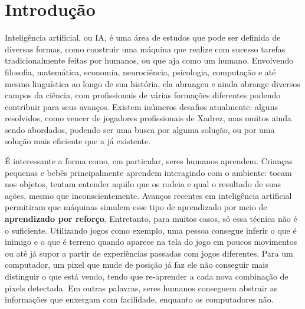 
\chapter{Introdução}
\label{cap:introducao}

Inteligência artificial, ou IA, é uma área de estudos que pode ser definida de diversas formas, como construir uma máquina que realize com sucesso tarefas tradicionalmente feitas por humanos, ou que aja como um humano.
Envolvendo filosofia, matemática, economia, neurociência, psicologia, computação e até mesmo linguística ao longo de sua história, ela abrangeu e ainda abrange diversos campos da ciência, com profissionais de várias formações diferentes podendo contribuir para seus avanços.
Existem inúmeros desafios atualmente: alguns resolvidos, como vencer de jogadores profissionais de Xadrez, mas muitos ainda sendo abordados, podendo ser uma busca por alguma solução, ou por uma solução mais eficiente que a já existente.

É interessante a forma como, em particular, seres humanos aprendem.
Crianças pequenas e bebês principalmente aprendem interagindo com o ambiente: tocam nos objetos, tentam entender aquilo que os rodeia e qual o resultado de suas ações, mesmo que inconscientemente.
Avanços recentes em inteligência artificial permitiram que máquinas simulem esse tipo de aprendizado por meio de \textbf{aprendizado por reforço}.
Entretanto, para muitos casos, só essa técnica não é o suficiente.
Utilizando jogos como exemplo, uma pessoa consegue inferir o que é inimigo e o que é terreno quando aparece na tela do jogo em poucos movimentos ou até já supor a partir de experiências passadas com jogos diferentes.
Para um computador, um pixel que mude de posição já faz ele não conseguir mais distinguir o que está vendo, tendo que re-aprender a cada nova combinação de pixels detectada.
Em outras palavras, seres humanos conseguem abstrair as informações que enxergam com facilidade, enquanto os computadores não.

